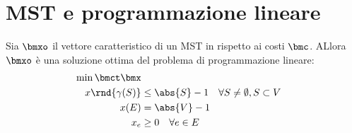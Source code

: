 \documentclass[\main/main.tex]{subfiles}
\begin{document}
\section{MST e programmazione lineare}
\begin{theorem}
  Sia \(\bmxo\) il vettore caratteristico di un MST in rispetto ai costi \(\bmc \). ALlora \(\bmxo\) è una soluzione ottima del problema di programmazione lineare:
  \begin{align*}
    \min \bmct\bmx                                                                 \\
    x\rnd{\gamma(S)} & \leq \abs{S} -1 \quad \forall S \neq \emptyset, S \subset V \\
    x(E)             & = \abs{V} -1                                                \\
    x_e              & \geq 0                       \quad \forall e \in E
  \end{align*}
\end{theorem}
\end{document}
